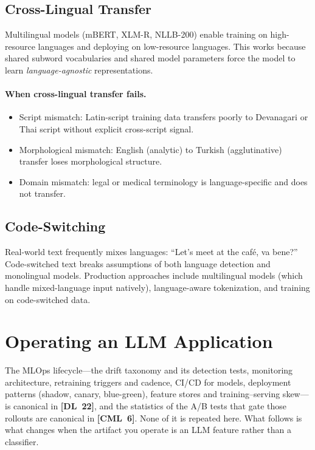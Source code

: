\subsection{Cross-Lingual Transfer}

Multilingual models (mBERT, XLM-R, NLLB-200) enable training on high-resource languages
and deploying on low-resource languages.  This works because shared subword vocabularies
and shared model parameters force the model to learn \emph{language-agnostic}
representations.

\paragraph{When cross-lingual transfer fails.}
\begin{itemize}
    \item Script mismatch: Latin-script training data transfers poorly to Devanagari or
          Thai script without explicit cross-script signal.
    \item Morphological mismatch: English (analytic) to Turkish (agglutinative)
          transfer loses morphological structure.
    \item Domain mismatch: legal or medical terminology is language-specific and does
          not transfer.
\end{itemize}

\subsection{Code-Switching}

Real-world text frequently mixes languages: ``Let's meet at the caf\'{e}, va bene?''
Code-switched text breaks assumptions of both language detection and monolingual models.
Production approaches include multilingual models (which handle mixed-language input
natively), language-aware tokenization, and training on code-switched data.


\section{Operating an LLM Application}
\label{sec:mlops_nlp}

The MLOps lifecycle---the drift taxonomy and its detection tests, monitoring
architecture, retraining triggers and cadence, CI/CD for models, deployment
patterns (shadow, canary, blue-green), feature stores and training--serving
skew---is canonical in \textbf{[DL~22]}, and the statistics of the A/B tests
that gate those rollouts are canonical in \textbf{[CML~6]}.  None of it is
repeated here.  What follows is what changes when the artifact you operate is
an LLM feature rather than a classifier.

